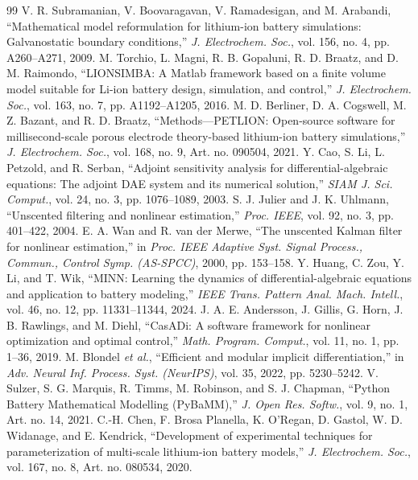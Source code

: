 \documentclass[journal]{IEEEtran}
\begin{document}
\begin{thebibliography}{99}
 V. R. Subramanian, V. Boovaragavan, V. Ramadesigan, and M. Arabandi, ``Mathematical model reformulation for lithium-ion battery simulations: Galvanostatic boundary conditions,'' \emph{J. Electrochem. Soc.}, vol. 156, no. 4, pp. A260--A271, 2009.
 M. Torchio, L. Magni, R. B. Gopaluni, R. D. Braatz, and D. M. Raimondo, ``LIONSIMBA: A Matlab framework based on a finite volume model suitable for Li-ion battery design, simulation, and control,'' \emph{J. Electrochem. Soc.}, vol. 163, no. 7, pp. A1192--A1205, 2016.
 M. D. Berliner, D. A. Cogswell, M. Z. Bazant, and R. D. Braatz, ``Methods---PETLION: Open-source software for millisecond-scale porous electrode theory-based lithium-ion battery simulations,'' \emph{J. Electrochem. Soc.}, vol. 168, no. 9, Art. no. 090504, 2021.
 Y. Cao, S. Li, L. Petzold, and R. Serban, ``Adjoint sensitivity analysis for differential-algebraic equations: The adjoint DAE system and its numerical solution,'' \emph{SIAM J. Sci. Comput.}, vol. 24, no. 3, pp. 1076--1089, 2003.
 S. J. Julier and J. K. Uhlmann, ``Unscented filtering and nonlinear estimation,'' \emph{Proc. IEEE}, vol. 92, no. 3, pp. 401--422, 2004.
 E. A. Wan and R. van der Merwe, ``The unscented Kalman filter for nonlinear estimation,'' in \emph{Proc. IEEE Adaptive Syst. Signal Process., Commun., Control Symp. (AS-SPCC)}, 2000, pp. 153--158.
 Y. Huang, C. Zou, Y. Li, and T. Wik, ``MINN: Learning the dynamics of differential-algebraic equations and application to battery modeling,'' \emph{IEEE Trans. Pattern Anal. Mach. Intell.}, vol. 46, no. 12, pp. 11331--11344, 2024.
 J. A. E. Andersson, J. Gillis, G. Horn, J. B. Rawlings, and M. Diehl, ``CasADi: A software framework for nonlinear optimization and optimal control,'' \emph{Math. Program. Comput.}, vol. 11, no. 1, pp. 1--36, 2019.
 M. Blondel \emph{et al.}, ``Efficient and modular implicit differentiation,'' in \emph{Adv. Neural Inf. Process. Syst. (NeurIPS)}, vol. 35, 2022, pp. 5230--5242.
 V. Sulzer, S. G. Marquis, R. Timms, M. Robinson, and S. J. Chapman, ``Python Battery Mathematical Modelling (PyBaMM),'' \emph{J. Open Res. Softw.}, vol. 9, no. 1, Art. no. 14, 2021.
 C.-H. Chen, F. Brosa Planella, K. O'Regan, D. Gastol, W. D. Widanage, and E. Kendrick, ``Development of experimental techniques for parameterization of multi-scale lithium-ion battery models,'' \emph{J. Electrochem. Soc.}, vol. 167, no. 8, Art. no. 080534, 2020.

\end{thebibliography}
\end{document}
